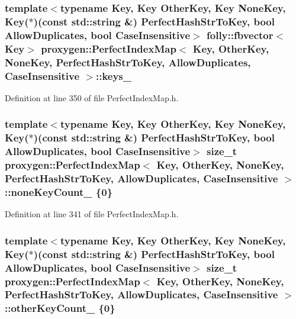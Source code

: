\subsubsection[{keys\+\_\+}]{\setlength{\rightskip}{0pt plus 5cm}template$<$typename Key, Key Other\+Key, Key None\+Key, Key($\ast$)(const std\+::string \&) Perfect\+Hash\+Str\+To\+Key, bool Allow\+Duplicates, bool Case\+Insensitive$>$ folly\+::fbvector$<$Key$>$ {\bf proxygen\+::\+Perfect\+Index\+Map}$<$ Key, Other\+Key, None\+Key, Perfect\+Hash\+Str\+To\+Key, Allow\+Duplicates, Case\+Insensitive $>$\+::keys\+\_\+\hspace{0.3cm}{\ttfamily [private]}}\label{classproxygen_1_1PerfectIndexMap_a5377eb97463ef4984a99ebd6b39ec092}


Definition at line 350 of file Perfect\+Index\+Map.\+h.

\subsubsection[{none\+Key\+Count\+\_\+}]{\setlength{\rightskip}{0pt plus 5cm}template$<$typename Key, Key Other\+Key, Key None\+Key, Key($\ast$)(const std\+::string \&) Perfect\+Hash\+Str\+To\+Key, bool Allow\+Duplicates, bool Case\+Insensitive$>$ size\+\_\+t {\bf proxygen\+::\+Perfect\+Index\+Map}$<$ Key, Other\+Key, None\+Key, Perfect\+Hash\+Str\+To\+Key, Allow\+Duplicates, Case\+Insensitive $>$\+::none\+Key\+Count\+\_\+ \{0\}\hspace{0.3cm}{\ttfamily [private]}}\label{classproxygen_1_1PerfectIndexMap_a8ec994351249fd32b5d8220380b722b7}


Definition at line 341 of file Perfect\+Index\+Map.\+h.

\subsubsection[{other\+Key\+Count\+\_\+}]{\setlength{\rightskip}{0pt plus 5cm}template$<$typename Key, Key Other\+Key, Key None\+Key, Key($\ast$)(const std\+::string \&) Perfect\+Hash\+Str\+To\+Key, bool Allow\+Duplicates, bool Case\+Insensitive$>$ size\+\_\+t {\bf proxygen\+::\+Perfect\+Index\+Map}$<$ Key, Other\+Key, None\+Key, Perfect\+Hash\+Str\+To\+Key, Allow\+Duplicates, Case\+Insensitive $>$\+::other\+Key\+Count\+\_\+ \{0\}\hspace{0.3cm}{\ttfamily [private]}}\label{classproxygen_1_1PerfectIndexMap_a7d90ca74c3e2324efb9bfc4a4a2dacef}


